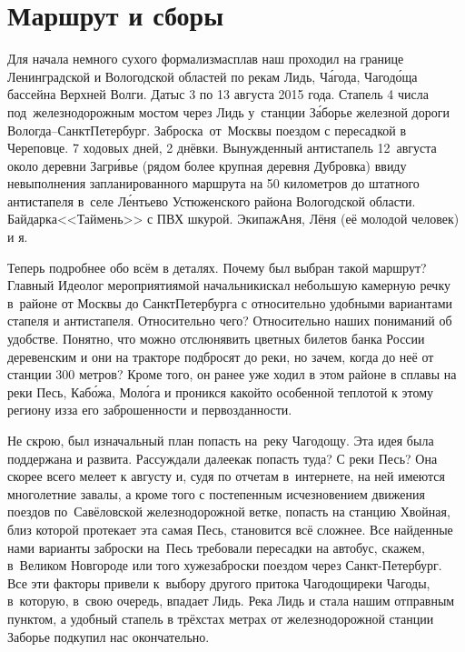 \chapter{Маршрут и сборы}

Для начала немного сухого формализма\mdash сплав наш проходил на границе Ленинградской и Вологодской областей по рекам Лидь, Ч\'{а}года, Чагод\'{о}ща бассейна Верхней Волги. Даты\mdash с 3 по 13 августа 2015 года. Стапель 4 числа под~железнодорожным мостом через Лидь у~станции З\'{а}борье железной дороги Вологда\nobreakdash--Санкт\sdash Петербург. Заброска~от~Москвы поездом с пересадкой в Череповце. 7 ходовых дней, 2 днёвки. Вынужденный антистапель 12~августа около деревни Загр\'{и}вье (рядом более крупная деревня Дубровка) ввиду невыполнения запланированного маршрута на 50 километров до штатного антистапеля в~селе Л\'{е}нтьево Устюженского района Вологодской области.  Байдарка\mdash <<Таймень>> с ПВХ шкурой. Экипаж\mdash Аня, Лёня (её молодой человек) и я.

Теперь подробнее обо всём в деталях. Почему был выбран такой маршрут? Главный Идеолог мероприятия\mdash мой начальник\mdash искал небольшую камерную речку в~районе от Москвы до Санкт\sdash Петербурга с относительно удобными вариантами стапеля и антистапеля. Относительно чего? Относительно наших пониманий об удобстве. Понятно, что можно отслюнявить цветных билетов банка России деревенским и они на тракторе подбросят до реки, но зачем, когда до неё от станции 300 метров? Кроме того, он ранее уже ходил в этом районе в сплавы на реки Песь, Каб\'{о}жа, Мол\'{о}га и проникся какой\sdash то особенной теплотой к этому региону из\sdash за его заброшенности и первозданности.

Не скрою, был изначальный план попасть на~реку Чагодощу. Эта идея была поддержана и развита. Рассуждали далее\mdash как попасть туда? С реки Песь? Она скорее всего мелеет к августу и, судя по отчетам в~интернете, на ней имеются многолетние завалы, а кроме того с постепенным исчезновением движения поездов по~Савёловской железнодорожной ветке, попасть на станцию Хвойная, близ которой протекает эта самая Песь, становится всё сложнее. Все найденные нами варианты заброски на~Песь требовали пересадки на автобус, скажем, в~Великом Новгороде или того хуже\mdash заброски поездом через Санкт-Петербург. Все эти факторы привели к~выбору другого притока Чагодощи\mdash реки Чагоды, в~которую, в~свою очередь, впадает Лидь. Река Лидь и стала нашим отправным пунктом, а удобный стапель в трёхстах метрах от железнодорожной станции Заборье подкупил нас окончательно. 

